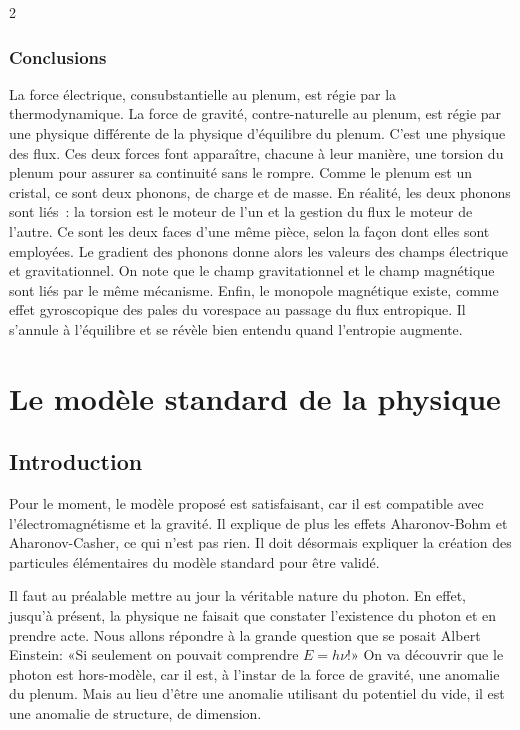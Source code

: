 \begin{multicols}{2}
\subsubsection{Conclusions}

La force électrique, consubstantielle au plenum, est
régie par la thermodynamique. La force de gravité, contre-naturelle
au plenum, est régie par une physique différente de la physique
d'équilibre du plenum. C'est une physique des flux. Ces deux forces
font apparaître, chacune à leur manière, une torsion du plenum pour
assurer sa continuité sans le rompre. Comme le plenum est un cristal,
ce sont deux phonons, de charge et de masse. En réalité, les deux
phonons sont liés : la torsion est le moteur de l'un et la gestion du
flux le moteur de l'autre. Ce sont les deux faces d'une même pièce,
selon la façon dont elles sont employées. Le gradient des phonons donne
alors les valeurs des champs électrique et gravitationnel. On note
que le champ gravitationnel et le champ magnétique sont liés par le
même mécanisme. Enfin, le monopole magnétique existe, comme effet
gyroscopique des pales du vorespace au passage du flux entropique. Il s'annule
à l'équilibre et se révèle bien entendu quand l'entropie
augmente.


\section{Le modèle standard de la physique}

\subsection{Introduction}

Pour le moment, le modèle proposé est satisfaisant, car il est
compatible avec l'électromagnétisme et la gravité. Il explique de
plus les effets Aharonov-Bohm et Aharonov-Casher, ce qui n'est pas
rien. Il doit désormais expliquer la création des particules
élémentaires du modèle standard pour être validé.

Il faut au préalable mettre au jour la véritable nature du photon. En effet, jusqu'à présent, la
physique ne faisait que constater l'existence du photon et en prendre
acte. Nous allons répondre à la grande question que se posait Albert
Einstein: «Si seulement on pouvait comprendre $E=h\nu$!»\cite{einstein1994correspondence} On va
découvrir que le photon est hors-modèle, car il est, à l'instar de la
force de gravité, une anomalie du plenum. Mais au lieu d'être une
anomalie utilisant du potentiel du vide, il est une anomalie de
structure, de dimension.


\end{multicols}
